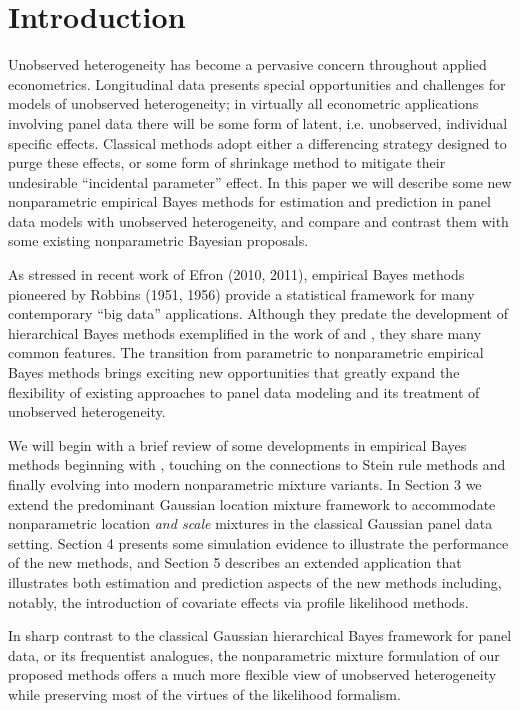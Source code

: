 \documentclass[12pt]{amsart}
\begin{document}
\section{Introduction}
Unobserved heterogeneity has become a pervasive concern throughout applied econometrics.  
Longitudinal data presents special opportunities and challenges for models of 
unobserved heterogeneity; in virtually all econometric applications involving
panel data there will be some form of latent, i.e. unobserved, individual specific
effects.  Classical methods adopt either a differencing strategy designed to
purge these effects, or some form of shrinkage method to mitigate their undesirable
``incidental parameter'' effect.  In this paper we will describe some new 
nonparametric empirical Bayes methods for estimation and
prediction in panel data models with unobserved heterogeneity, and compare
and contrast them with some existing nonparametric Bayesian proposals.

As stressed in recent work of Efron (2010, 2011), empirical Bayes methods pioneered
\nocite{Efron.10}
\nocite{efron.11}
by Robbins (1951, 1956) provide a statistical framework for many contemporary
``big data''  applications.  Although they predate the development of hierarchical
Bayes methods exemplified in the work of  and ,
they share many common features.  The transition from parametric to nonparametric
empirical Bayes methods brings exciting new opportunities that greatly expand the
flexibility of existing approaches to panel data modeling and its treatment of
unobserved heterogeneity.

We will begin with a brief review of some developments in empirical Bayes methods
beginning with , touching on the connections to Stein rule 
methods and finally evolving into modern nonparametric mixture variants.  In
Section 3 we extend the predominant Gaussian location mixture framework to accommodate
nonparametric location {\it and scale} mixtures in the classical Gaussian panel
data setting.  Section 4 presents some simulation evidence to illustrate the
performance of the new methods, and Section 5 describes an extended application
that illustrates both estimation and prediction aspects of the new methods including,
notably, the introduction of covariate effects via profile likelihood methods.

In sharp contrast to the classical Gaussian hierarchical Bayes framework for panel
data, or its frequentist analogues, the nonparametric mixture formulation of our
proposed methods offers a much more flexible view of unobserved heterogeneity
while preserving most of the virtues of the likelihood formalism. 
\end{document}
